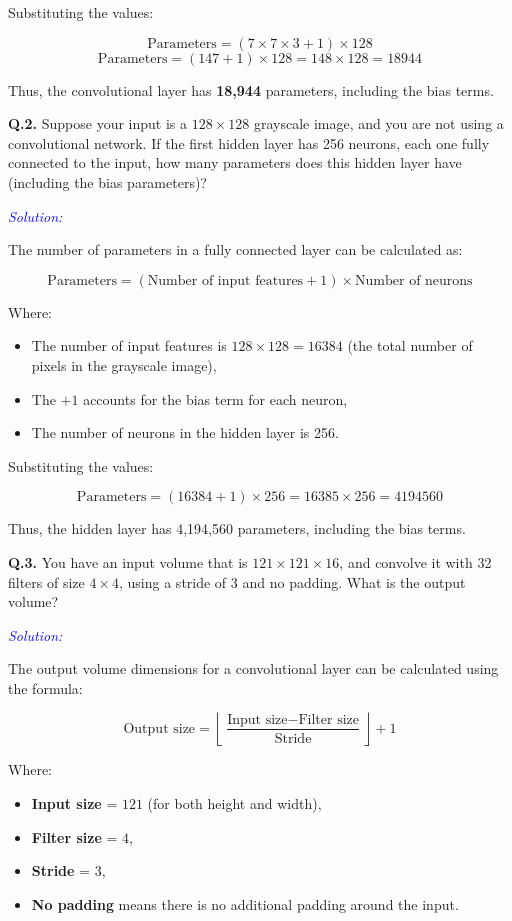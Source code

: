 \documentclass[letterpaper,12pt,notitlepage,twoside]{report}
\begin{document}
Substituting the values:

\[
\text{Parameters} = (7 \times 7 \times 3 + 1) \times 128
\]
\[
\text{Parameters} = (147 + 1) \times 128 = 148 \times 128 = 18944
\]

Thus, the convolutional layer has \textbf{18,944} parameters, including the bias terms.

\textbf{Q.2.} Suppose your input is a \( 128 \times 128 \) grayscale image, and you are not using a convolutional network. If the first hidden layer has 256 neurons, each one fully connected to the input, how many parameters does this hidden layer have (including the bias parameters)?

\textcolor{blue}{\textit{Solution:}}

The number of parameters in a fully connected layer can be calculated as:

\[
\text{Parameters} = (\text{Number of input features} + 1) \times \text{Number of neurons}
\]

Where:
\begin{itemize}
    \item The number of input features is \( 128 \times 128 = 16384 \) (the total number of pixels in the grayscale image),
    \item The \( +1 \) accounts for the bias term for each neuron,
    \item The number of neurons in the hidden layer is 256.
\end{itemize}

Substituting the values:

\[
\text{Parameters} = (16384 + 1) \times 256 = 16385 \times 256 = 4194560
\]

Thus, the hidden layer has 4,194,560 parameters, including the bias terms.

\textbf{Q.3.} You have an input volume that is \( 121 \times 121 \times 16 \), and convolve it with 32 filters of size \( 4 \times 4 \), using a stride of 3 and no padding. What is the output volume?

\textcolor{blue}{\textit{Solution:}}

The output volume dimensions for a convolutional layer can be calculated using the formula:

\[
\text{Output size} = \left\lfloor \frac{\text{Input size} - \text{Filter size}}{\text{Stride}} \right\rfloor + 1
\]

Where:
\begin{itemize}
    \item \textbf{Input size} = \( 121 \) (for both height and width),
    \item \textbf{Filter size} = \( 4 \),
    \item \textbf{Stride} = \( 3 \),
    \item \textbf{No padding} means there is no additional padding around the input.
\end{itemize}
\end{document}
